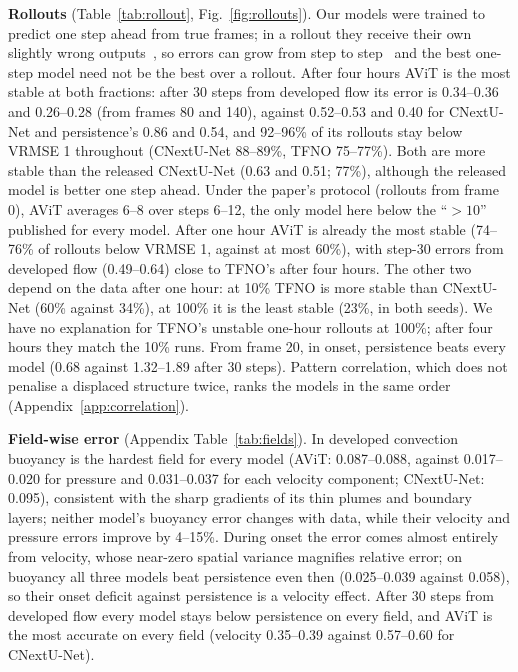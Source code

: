 \documentclass[11pt]{article}
\begin{document}
\textbf{Rollouts} (Table~\ref{tab:rollout}, Fig.~\ref{fig:rollouts}). Our models were trained to predict one step
ahead from true frames; in a rollout they receive their own slightly wrong outputs~\cite{brandstetter2022mp}, so
errors can grow from step to step~\cite{mccabe2023stability} and the best one-step model need not be the best over a
rollout. After four hours AViT is the most stable at both fractions: after 30 steps from developed flow its error is
0.34--0.36 and 0.26--0.28 (from frames 80 and 140), against 0.52--0.53 and 0.40 for CNextU-Net and persistence's 0.86
and 0.54, and 92--96\% of its rollouts stay below VRMSE 1 throughout (CNextU-Net 88--89\%, TFNO 75--77\%). Both are
more stable than the released CNextU-Net (0.63 and 0.51; 77\%), although the released model is better one step
ahead. Under the paper's protocol (rollouts from frame 0), AViT averages 6--8 over steps 6--12, the only model here
below the ``$>10$'' published for every model. After one hour AViT is already the most stable (74--76\% of rollouts
below VRMSE 1, against at most 60\%), with step-30 errors from developed flow (0.49--0.64) close to TFNO's after four
hours. The other two depend on the data after one hour: at 10\% TFNO is more stable than CNextU-Net (60\% against
34\%), at 100\% it is the least stable (23\%, in both seeds). We have no explanation for TFNO's unstable one-hour
rollouts at 100\%; after four hours they match the 10\% runs. From frame 20, in onset, persistence beats every model
(0.68 against 1.32--1.89 after 30 steps). Pattern correlation, which does not penalise a displaced structure twice,
ranks the models in the same order (Appendix~\ref{app:correlation}).

\textbf{Field-wise error} (Appendix Table~\ref{tab:fields}). In developed convection buoyancy is the hardest field for every
model (AViT: 0.087--0.088, against 0.017--0.020 for pressure and 0.031--0.037 for each velocity component;
CNextU-Net: 0.095), consistent with the sharp gradients of its thin plumes and boundary layers; neither model's
buoyancy error changes with data, while their velocity and pressure errors improve by 4--15\%. During onset the error
comes almost entirely from velocity, whose near-zero spatial variance magnifies relative error; on buoyancy all three
models beat persistence even then (0.025--0.039 against 0.058), so their onset deficit against persistence is a
velocity effect. After 30 steps from developed flow every model stays below persistence on every field, and AViT is
the most accurate on every field (velocity 0.35--0.39 against 0.57--0.60 for CNextU-Net).
\end{document}

